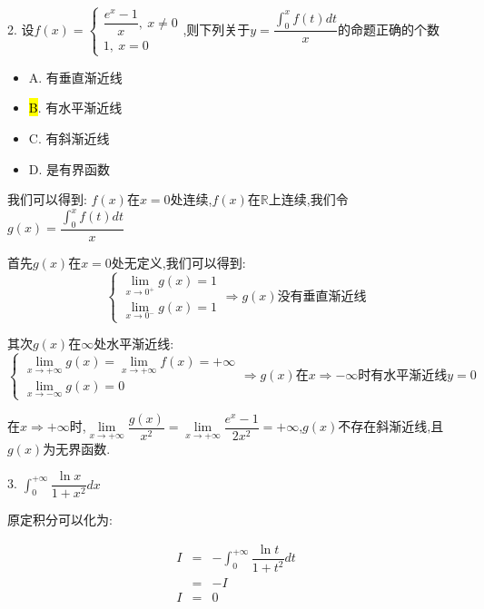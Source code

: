 2. 设$f(x)=\left\lbrace
\begin{array}{l}
	\dfrac{e^x-1}{x},\ x\neq 0\\
	1,\ x=0
\end{array}
\right. $,则下列关于$y=\dfrac{\int_{0}^{x}f(t)dt}{x}$的命题正确的个数
\begin{itemize}
	\item A. 有垂直渐近线
	\item \hl{B}. 有水平渐近线
	\item C. 有斜渐近线
	\item D. 是有界函数
\end{itemize}
\begin{solution}

	我们可以得到:  $f(x)$在$x=0$处连续,$f(x)$在$\mathbb{R}$上连续,我们令$g(x)=\dfrac{\int_{0}^{x}f(t)dt}{x}$
	
	首先$g(x)$在$x=0$处无定义,我们可以得到:  
	$$\left\lbrace
	\begin{array}{l}
		\lim\limits_{x\rightarrow 0^{+}}g(x)=1\\
		\lim\limits_{x\rightarrow 0^{-}}g(x)=1
	\end{array}
	\right. \Rightarrow g(x)\text{没有垂直渐近线}$$
	
	其次$g(x)$在$\infty$处水平渐近线:  
	$$\left\lbrace
	\begin{array}{l}
		\lim\limits_{x\rightarrow+\infty}g(x)=\lim\limits_{x\rightarrow+\infty}f(x)=+\infty\\
		\lim\limits_{x\rightarrow-\infty}g(x)=0
	\end{array}
	\right. \Rightarrow g(x)\text{在}x\Rightarrow -\infty\text{时}\text{有水平渐近线}y=0$$
	
	在$x\Rightarrow +\infty$时,$\lim\limits_{x\rightarrow+\infty}\dfrac{g(x)}{x^2}=\lim\limits_{x\rightarrow +\infty}\dfrac{e^x-1}{2x^2}=+\infty$,$g(x)$不存在斜渐近线,且$g(x)$为无界函数.
	
\end{solution}

3. $\int_{0}^{+\infty}\dfrac{\ln x}{1+x^2}dx$
\begin{solution}

	原定积分可以化为:  

	\begin{eqnarray*}
		I&=&-\int_{0}^{+\infty}\dfrac{\ln t}{1+t^2}dt\\
		&=&-I\\
		I&=&0
	\end{eqnarray*}
\end{solution}

